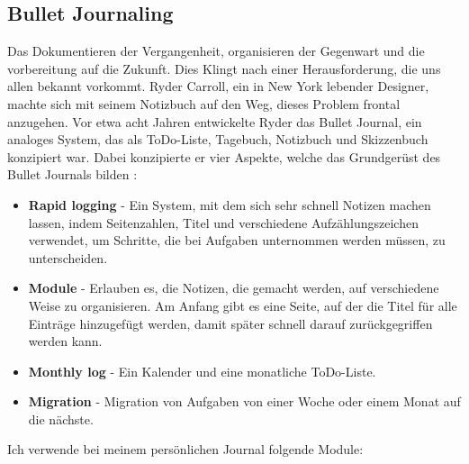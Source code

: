 \subsection{Bullet Journaling}
\authortoc{\jonas}{\subsectionident}
\label{bulletjournaling}
Das Dokumentieren der Vergangenheit, organisieren der Gegenwart und die vorbereitung auf die Zukunft.
\newline
Dies Klingt nach einer Herausforderung, die uns allen bekannt vorkommt.
\newline
Ryder Carroll, ein in New York lebender Designer, machte sich mit seinem Notizbuch auf den Weg, dieses Problem frontal anzugehen. Vor etwa acht Jahren entwickelte Ryder das Bullet Journal, ein analoges System, das als ToDo-Liste, Tagebuch, Notizbuch und Skizzenbuch konzipiert war. Dabei konzipierte er vier Aspekte, welche das Grundgerüst des Bullet Journals bilden \cite{bulletjournal_2020} :
\begin{itemize}
  \item \textbf{Rapid logging} - Ein System, mit dem sich sehr schnell Notizen machen lassen, indem Seitenzahlen, Titel und verschiedene Aufzählungszeichen verwendet, um Schritte, die bei Aufgaben unternommen werden müssen, zu unterscheiden.
  \item \textbf{Module} - Erlauben es, die Notizen, die gemacht werden, auf verschiedene Weise zu organisieren. Am Anfang gibt es eine Seite, auf der die Titel für alle Einträge hinzugefügt werden, damit später schnell darauf zurückgegriffen werden kann.
  \item \textbf{Monthly log} - Ein Kalender und eine monatliche ToDo-Liste.
  \item \textbf{Migration} - Migration von Aufgaben von einer Woche oder einem Monat auf die nächste.
\end{itemize}
Ich verwende bei meinem persönlichen Journal folgende Module:
